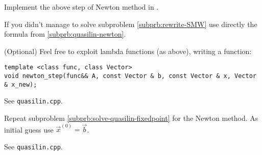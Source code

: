 \begin{problem}
\begin{subproblem}[4]
 Implement the above step of Newton method in \Eigen{}.
 
 \begin{hint}
  If you didn't manage to solve subproblem \ref{subprb:rewrite-SMW} use directly the formula from \ref{subprb:quasilin-newton}.
 \end{hint}
 
 \begin{hint}
  (Optional) Feel free to exploit lambda functions (as above), writing  a function:
 \begin{lstlisting}
template <class func, class Vector>
void newton_step(func&& A, const Vector & b, const Vector & x, Vector & x_new);
 \end{lstlisting}
 \end{hint}

 \cprotEnv \begin{solution}
  See \verb|quasilin.cpp|.
 \end{solution}

\end{subproblem}

\begin{subproblem}[1]
 Repeat subproblem \ref{subprb:solve-quasilin-fixedpoint} for the Newton method.
 As initial guess use $\vec{x}^{(0)} = \vec{b}$.
 
 \cprotEnv \begin{solution}
  See \verb|quasilin.cpp|.
 \end{solution}
\end{subproblem}
 
\end{problem}

 
